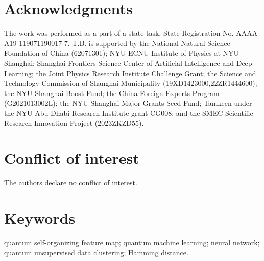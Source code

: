 \documentclass[pra,showkeys,twocolumn,showpacs]{revtex4-1}
\begin{document}
\section*{Acknowledgments}
The work was performed as a part of a state task, State Registration No. AAAA-A19-119071190017-7.
T.B. is supported by the National Natural Science Foundation of China (62071301); 
NYU-ECNU Institute of Physics at NYU Shanghai; 
Shanghai Frontiers Science Center of Artificial Intelligence and Deep Learning; 
the Joint Physics Research Institute Challenge Grant; 
the Science and Technology Commission of Shanghai Municipality (19XD1423000,22ZR1444600); 
the NYU Shanghai Boost Fund; the China Foreign Experts Program (G2021013002L); 
the NYU Shanghai Major-Grants Seed Fund; Tamkeen under the NYU Abu Dhabi Research Institute grant CG008; 
and the SMEC Scientific Research Innovation Project (2023ZKZD55).







\section*{Conflict of interest}

The authors declare no conflict of interest.


\section*{Keywords}
quantum self-organizing feature map; quantum machine learning; neural network; quantum unsupervised data clustering; Hamming distance.



\end{document}
